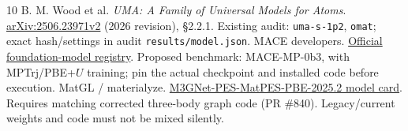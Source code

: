 \begin{thebibliography}{10}
 B. M. Wood et al. \emph{UMA: A Family of Universal Models for Atoms}. \href{https://arxiv.org/html/2506.23971v2}{arXiv:2506.23971v2} (2026 revision), \S2.2.1. Existing audit: \texttt{uma-s-1p2}, \texttt{omat}; exact hash/settings in audit \texttt{results/model.json}.
 MACE developers. \href{https://github.com/ACEsuit/mace-foundations}{Official foundation-model registry}. Proposed benchmark: MACE-MP-0b3, with MPTrj/PBE+$U$ training; pin the actual checkpoint and installed code before execution.
 MatGL / materialyze. \href{https://huggingface.co/materialyze/M3GNet-PES-MatPES-PBE-2025.2}{M3GNet-PES-MatPES-PBE-2025.2 model card}. Requires matching corrected three-body graph code (PR \#840). Legacy/current weights and code must not be mixed silently.
\end{thebibliography}
\endgroup
